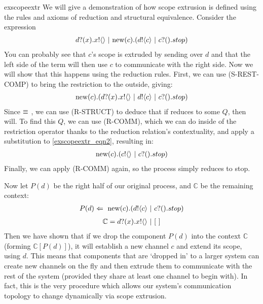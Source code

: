 \begin{example}{exscopeextr}
	We will give a demonstration of how scope extrusion is defined using the rules and axioms of reduction and structural equivalence.  
Consider the expression 
\begin{align}\label{exscopeextr_eqn1}
	{d}?({x}).{x}!\langle{}\rangle\ |\  \text{new}({c}).({d}!\langle{c}\rangle \ |\  {c}?({}).stop)	
\end{align}
You can probably see that $c$'s scope is extruded by sending over $d$ and that the left side of the term will then use $c$ to communicate with the right side.  Now we will show that this happens using the reduction rules.  First, we can use (S-REST-COMP) to bring the restriction to the outside, giving:
\begin{align}\label{exscopeextr_eqn2}
	\text{new}({c}).({d}?({x}).{x}!\langle{}\rangle\ |\  {d}!\langle{c}\rangle \ |\  {c}?({}).stop)		
\end{align}
	Since \label{exscopeextr_eqn1} $\equiv$ \label{exscopeextr_eqn2}, we can use (R-STRUCT) to deduce that if \label{exscopeextr_eqn2} reduces to some $Q$, then \label{exscopeextr_eqn1} will.
	To find this $Q$, we can use (R-COMM), which we can do inside of the restriction operator thanks to the reduction relation's contextuality, and apply a substitution to \ref{exscopeextr_eqn2}, resulting in:
\begin{align}
	\text{new}({c}).({c}!\langle{}\rangle \ |\  {c}?({}).stop)
\end{align}
	Finally, we can apply (R-COMM) again, so the process simply reduces to stop.  


	Now let $P(d)$ be the right half of our original process, and $\mathbb{C}$ be the remaining context:
	\begin{align}
		P(d) \Leftarrow\  \text{new}({c}).({d}!\langle{c}\rangle \ |\  {c}?({}).stop)
	\end{align}
	\begin{align}
		\mathbb{C} = {d}?({x}).{x}!\langle{}\rangle \ |\  [\ ]
	\end{align}
Then we have shown that if we drop the component $P(d)$ into the context $\mathbb{C}$ (forming $\mathbb{C}[P(d)]$), it will establish a new channel $c$ and extend its scope, using $d$.
This means that components that are `dropped in' to a larger system can create new channels on the fly and then extrude them to communicate with the rest of the system (provided they share at least one channel to begin with).  
In fact, this is the very procedure which allows our system's communication topology to change dynamically via scope extrusion.
\end{example}

